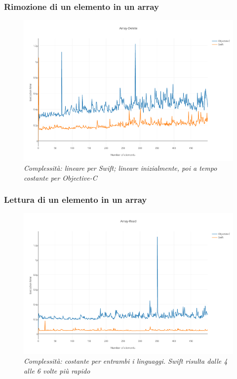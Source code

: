 \subsubsection{Rimozione di un elemento in un array}
\begin{figure}[H]
      \centering
      \includegraphics[scale=0.50]{immagini/array_delete.png}
            \vspace{0.8cm}
            \caption{\textit{Complessità: lineare per Swift; lineare inizialmente, poi a tempo costante per Objective-C}}
\end{figure}
\subsubsection{Lettura di un elemento in un array}
\begin{figure}[H]
      \centering
      \includegraphics[scale=0.50]{immagini/array_read.png}
            \vspace{0.8cm}
            \caption{\textit{Complessità: costante per entrambi i linguaggi. Swift risulta dalle 4 alle 6 volte più rapido}}
\end{figure}
